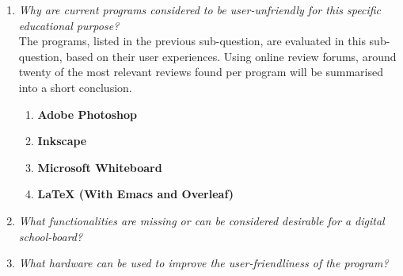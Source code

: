\documentclass[a4paper,12pt]{article}
\begin{document}
\begin{enumerate}
\begin{enumerate}
    \underline{Pros:}\\
    \LaTeX is highly flexible and can be used for simple notes, but also for complex reports and documents. It is capable of displaying mathematical signs and formulas and has great community support. A user can choose a text editor best suited to the needs and wishes of the user.\\
    
    \underline{Cons:}\\
    The learning curve can be especially hard for users with little affinity to coding or markdown languages. Also, if the user encounters an unknown sign, looking for the right keyword can be a lengthy process, which is undesirable for example during classes. Also, free drawing is not supported, which can be difficult in certain educational situations.\\
    
  \end{enumerate}
  
\item \textit{Why are current programs considered to be user-unfriendly for this specific educational purpose?}\\
  The programs, listed in the previous sub-question, are evaluated in this sub-question, based on their user experiences. Using online review forums, around twenty of the most relevant reviews found per program will be summarised into a short conclusion.
  
  \begin{enumerate}
  \item \textbf{Adobe Photoshop}\\
    
  \item \textbf{Inkscape}\\
    
  \item \textbf{Microsoft Whiteboard}\\
    
  \item \textbf{LaTeX (With Emacs and Overleaf)}\\
    
  \end{enumerate}
  
\item \textit{What functionalities are missing or can be considered desirable for a digital school-board?}\\
  
\item \textit{What hardware can be used to improve the user-friendliness of the program?}\\


\end{enumerate}
\end{document}
